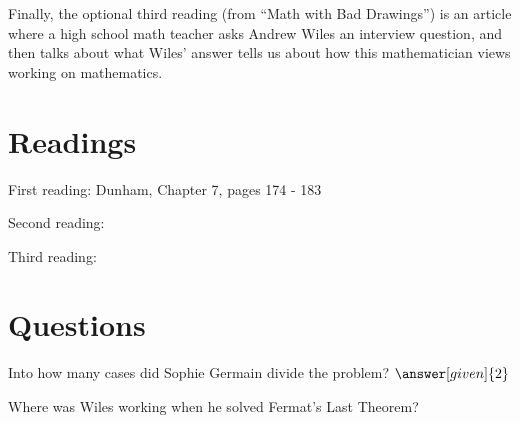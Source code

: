 \documentclass[nooutcomes]{ximera}
\begin{document}
Finally, the optional third reading (from ``Math with Bad Drawings'') is an article where a high school math teacher asks Andrew Wiles an interview question, and then talks about what Wiles' answer tells us about how this mathematician views working on mathematics.

\section{Readings}
First reading: Dunham, Chapter 7, pages 174 - 183

Second reading: 

Third reading: 



\section{Questions}

\begin{question}
Into how many cases did Sophie Germain divide the problem? $\answer[given]{2}$
\end{question}

\begin{question}
Where was Wiles working when he solved Fermat's Last Theorem?
\begin{multipleChoice}
\end{multipleChoice}
\end{question}

%
%


\end{document}
